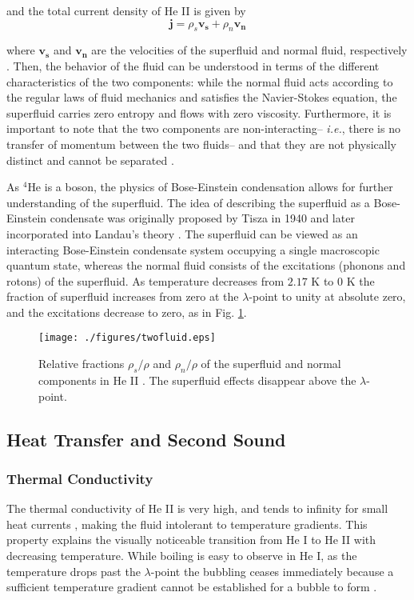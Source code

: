 and the total current density of He II is given by
\begin{equation}
\mathbf{j} = \rho_s\mathbf{v_s} + \rho_n\mathbf{v_n}
\end{equation}

where $\mathbf{v_s}$ and $\mathbf{v_n}$ are the velocities of the
superfluid and normal fluid, respectively \cite{tilley}. Then, the
behavior of the fluid can be understood in terms of the different
characteristics of the two components: while the normal fluid acts
according to the regular laws of fluid mechanics and satisfies the
Navier-Stokes equation, the superfluid carries zero entropy and flows
with zero viscosity. Furthermore, it is important to note that the two
components are non-interacting-- \emph{i.e.}, there is no transfer of
momentum between the two fluids-- and that they are
not physically distinct and cannot be separated \cite{tilley}.

As $^{4}$He is a boson, the physics of Bose-Einstein condensation allows for further
understanding of the superfluid. The idea of describing the superfluid
as a Bose-Einstein condensate was originally proposed by Tisza in 1940
and later incorporated into Landau's theory \cite{tisza}. The
superfluid can be viewed as an interacting Bose-Einstein condensate
system occupying a single macroscopic quantum state, whereas the
normal fluid consists of the excitations (phonons and rotons) of the
superfluid. As temperature decreases from $2.17$ K to $0$ K the fraction
of superfluid increases from zero at the $\lambda$-point to unity at
absolute zero, and the excitations decrease to zero, as in Fig.
\ref{fig:twofluid}\cite{andro}.

\begin{figure}[ht]
\begin{center}
\texttt{[image: ./figures/twofluid.eps]}
\caption{\small{Relative fractions $\rho_s/\rho$ and $\rho_n/\rho$ of
    the superfluid and normal components in He II \cite{andro}. The
    superfluid effects disappear above the $\lambda$-point.}}
\label{fig:twofluid}
\end{center}
\end{figure}


\subsection{Heat Transfer and Second Sound}\label{heattransferandsecondsound}

\subsubsection{Thermal Conductivity}\label{thermalconductivity}
The thermal conductivity of He II is very high, and tends to infinity
for small heat currents \cite{tilley}, making the fluid intolerant to
temperature gradients. This property explains the visually noticeable
transition from He I to He II with decreasing temperature.  While
boiling is easy to observe in He I, as the temperature drops past the
$\lambda$-point the bubbling ceases immediately because a sufficient
temperature gradient cannot be established for a bubble to
form \cite{tilley}.


